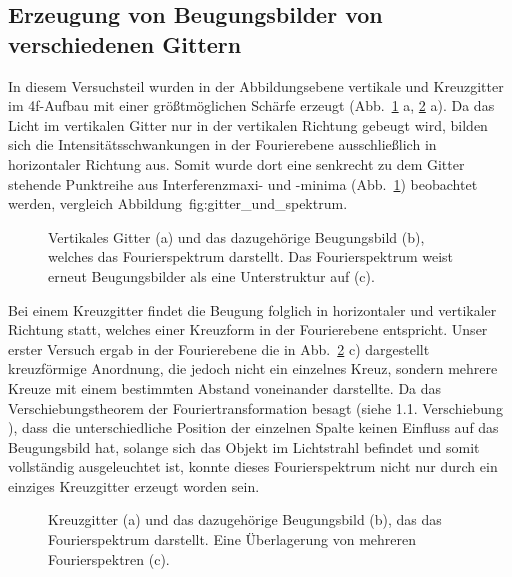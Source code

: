 \subsection{Erzeugung von Beugungsbilder von verschiedenen Gittern}

In diesem Versuchsteil wurden in der Abbildungsebene vertikale und Kreuzgitter im 4f-Aufbau mit einer größtmöglichen Schärfe erzeugt (Abb.~\ref{fig:gitter_und_spektrum} a, \ref{fig:kreuzgitter_und_spektrum} a). %
Da das Licht im vertikalen Gitter nur in der vertikalen Richtung gebeugt wird, bilden sich die Intensitätsschwankungen in der Fourierebene ausschließlich in horizontaler Richtung aus. Somit wurde dort eine senkrecht zu dem Gitter stehende Punktreihe aus Interferenzmaxi- und -minima (Abb.~\ref{fig:gitter_und_spektrum}) beobachtet werden, vergleich Abbildung~{fig:gitter_und_spektrum}.
	
\begin{figure}[ht]
	\centering
	\caption[Gitter mit Fourierspektrum]{
		Vertikales Gitter (a) und das dazugehörige Beugungsbild (b), welches das Fourierspektrum darstellt. Das Fourierspektrum weist erneut Beugungsbilder als eine Unterstruktur auf (c).
	}
	\label{fig:gitter_und_spektrum}
\end{figure}


Bei einem Kreuzgitter findet die Beugung folglich in horizontaler und vertikaler Richtung statt, welches einer Kreuzform in der Fourierebene entspricht. Unser erster Versuch ergab in
der Fourierebene die in Abb.~\ref{fig:kreuzgitter_und_spektrum} c) dargestellt kreuzförmige Anordnung, die jedoch nicht ein einzelnes Kreuz, sondern mehrere Kreuze mit einem bestimmten Abstand voneinander
darstellte. Da das Verschiebungstheorem der Fouriertransformation besagt (siehe 1.1. Verschiebung%
), dass die unterschiedliche Position der einzelnen Spalte keinen Einfluss auf das Beugungsbild hat, solange sich das Objekt im Lichtstrahl befindet und somit vollständig ausgeleuchtet ist, konnte dieses Fourierspektrum nicht nur durch ein einziges Kreuzgitter erzeugt worden sein. 

\begin{figure}[ht]
	\centering
	\caption[Kreuzgitter mit Fourierspektrum]{
		Kreuzgitter (a) und das dazugehörige Beugungsbild (b), das das Fourierspektrum darstellt. Eine Überlagerung von mehreren Fourierspektren (c).
	}
	\label{fig:kreuzgitter_und_spektrum}
\end{figure}

